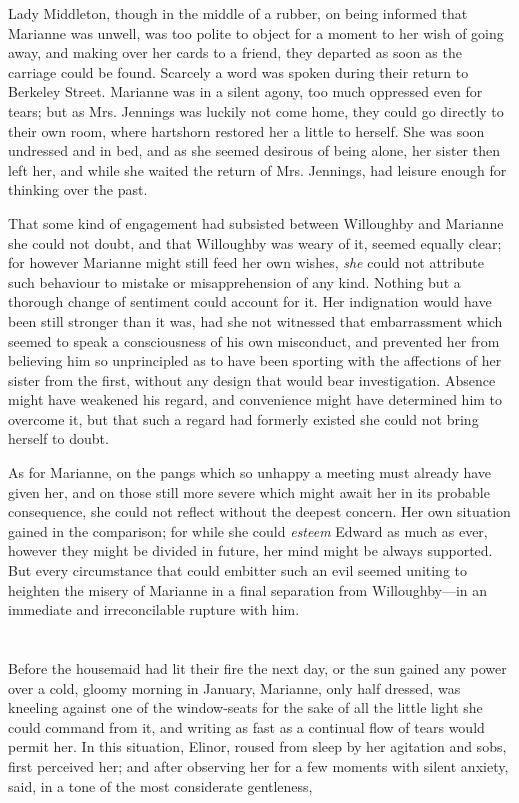 Lady Middleton, though in the middle of a rubber, on being informed that Marianne was unwell, was too polite to object for a moment to her wish of going away, and making over her cards to a friend, they departed as soon as the carriage could be found. Scarcely a word was spoken during their return to Berkeley Street. Marianne was in a silent agony, too much oppressed even for tears; but as Mrs. Jennings was luckily not come home, they could go directly to their own room, where hartshorn restored her a little to herself. She was soon undressed and in bed, and as she seemed desirous of being alone, her sister then left her, and while she waited the return of Mrs. Jennings, had leisure enough for thinking over the past.

That some kind of engagement had subsisted between Willoughby and Marianne she could not doubt, and that Willoughby was weary of it, seemed equally clear; for however Marianne might still feed her own wishes, {\em she} could not attribute such behaviour to mistake or misapprehension of any kind. Nothing but a thorough change of sentiment could account for it. Her indignation would have been still stronger than it was, had she not witnessed that embarrassment which seemed to speak a consciousness of his own misconduct, and prevented her from believing him so unprincipled as to have been sporting with the affections of her sister from the first, without any design that would bear investigation. Absence might have weakened his regard, and convenience might have determined him to overcome it, but that such a regard had formerly existed she could not bring herself to doubt.

As for Marianne, on the pangs which so unhappy a meeting must already have given her, and on those still more severe which might await her in its probable consequence, she could not reflect without the deepest concern. Her own situation gained in the comparison; for while she could {\em esteem} Edward as much as ever, however they might be divided in future, her mind might be always supported. But every circumstance that could embitter such an evil seemed uniting to heighten the misery of Marianne in a final separation from Willoughby---in an immediate and irreconcilable rupture with him.

\chapter{} %

Before the housemaid had lit their fire the next day, or the sun gained any power over a cold, gloomy morning in January, Marianne, only half dressed, was kneeling against one of the window-seats for the sake of all the little light she could command from it, and writing as fast as a continual flow of tears would permit her. In this situation, Elinor, roused from sleep by her agitation and sobs, first perceived her; and after observing her for a few moments with silent anxiety, said, in a tone of the most considerate gentleness,

